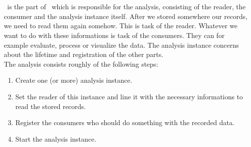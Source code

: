 \chapter{\KiekerAnalysis}
      \KiekerAnalysis\ is the part of \Kieker\ which is responsible for the analysis, consisting of the reader, the consumer and the analysis instance itself. After we stored somewhere our records, we need to read them again somehow. This is task of the reader. Whatever we want to do with these informations is task of the consumers. They can for example evaluate, process or visualize the data. The analysis instance concerns about the lifetime and registration of the other parts.\\
      The analysis consists roughly of the following steps:
      \begin{enumerate}
	\item Create one (or more) analysis instance.
	\item Set the reader of this instance and line it with the necessary informations to read the stored records.
	\item Register the consumers who should do something with the recorded data.
	\item Start the analysis instance.
      \end{enumerate}


